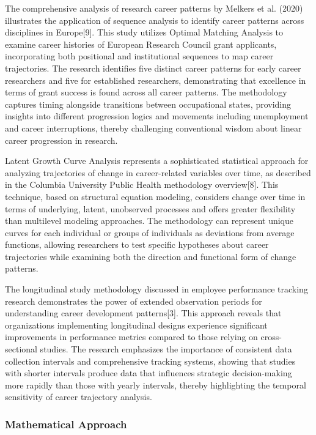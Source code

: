 \documentclass[main.tex]{subfiles}
\begin{document}
The comprehensive analysis of research career patterns by Melkers et al. (2020) illustrates the application of sequence analysis to identify career patterns across disciplines in Europe[9]. This study utilizes Optimal Matching Analysis to examine career histories of European Research Council grant applicants, incorporating both positional and institutional sequences to map career trajectories. The research identifies five distinct career patterns for early career researchers and five for established researchers, demonstrating that excellence in terms of grant success is found across all career patterns. The methodology captures timing alongside transitions between occupational states, providing insights into different progression logics and movements including unemployment and career interruptions, thereby challenging conventional wisdom about linear career progression in research.

Latent Growth Curve Analysis represents a sophisticated statistical approach for analyzing trajectories of change in career-related variables over time, as described in the Columbia University Public Health methodology overview[8]. This technique, based on structural equation modeling, considers change over time in terms of underlying, latent, unobserved processes and offers greater flexibility than multilevel modeling approaches. The methodology can represent unique curves for each individual or groups of individuals as deviations from average functions, allowing researchers to test specific hypotheses about career trajectories while examining both the direction and functional form of change patterns.

The longitudinal study methodology discussed in employee performance tracking research demonstrates the power of extended observation periods for understanding career development patterns[3]. This approach reveals that organizations implementing longitudinal designs experience significant improvements in performance metrics compared to those relying on cross-sectional studies. The research emphasizes the importance of consistent data collection intervals and comprehensive tracking systems, showing that studies with shorter intervals produce data that influences strategic decision-making more rapidly than those with yearly intervals, thereby highlighting the temporal sensitivity of career trajectory analysis.

\subsubsection{Mathematical Approach}
\end{document}
